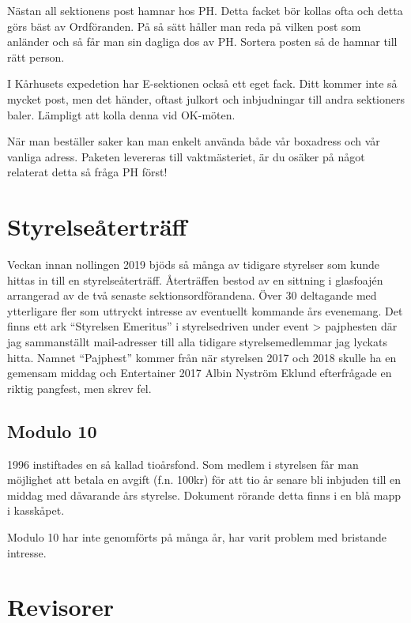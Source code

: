 \documentclass[10pt]{article}
\begin{document}
    Nästan all sektionens post hamnar hos PH. Detta facket bör kollas ofta och detta görs bäst av Ordföranden. På så sätt håller man reda på vilken post som anländer och så får man sin dagliga dos av PH. Sortera posten så de hamnar till rätt person.
    
    I Kårhusets expedetion har E-sektionen också ett eget fack. Ditt kommer inte så mycket post, men det händer, oftast julkort och inbjudningar till andra sektioners baler. Lämpligt att kolla denna vid OK-möten.
    
    När man beställer saker kan man enkelt använda både vår boxadress och vår vanliga adress. Paketen levereras till vaktmästeriet, är du osäker på något relaterat detta så fråga PH först!
    
   \section{Styrelseåterträff}

    Veckan innan nollingen 2019 bjöds så många av tidigare styrelser som kunde hittas in till en styrelseåterträff. Återträffen bestod av en sittning i glasfoajén arrangerad av de två senaste sektionsordförandena. Över 30 deltagande med ytterligare fler som uttryckt intresse av eventuellt kommande års evenemang. Det finns ett ark ``Styrelsen Emeritus'' i styrelsedriven under event > pajphesten där jag sammanställt mail-adresser till alla tidigare styrelsemedlemmar jag lyckats hitta. Namnet ``Pajphest'' kommer från när styrelsen 2017 och 2018 skulle ha en gemensam middag och Entertainer 2017 Albin Nyström Eklund efterfrågade en riktig pangfest, men skrev fel.

    \subsection{Modulo 10}
    
    1996 instiftades en så kallad tioårsfond. Som medlem i styrelsen får man möjlighet att betala en avgift (f.n. 100kr) för att tio år senare bli inbjuden till en middag med dåvarande års styrelse. Dokument rörande detta finns i en blå mapp i kasskåpet.
    
    Modulo 10 har inte genomförts på många år, har varit problem med bristande intresse.
       
    \section{Revisorer}
    
\end{document}
